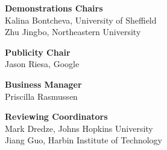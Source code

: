 {\bf Demonstrations Chairs} \\
Kalina Bontcheva, University of Sheffield \\
Zhu Jingbo, Northeastern University \\

{\bf Publicity Chair} \\
Jason Riesa, Google \\

{\bf Business Manager} \\
Priscilla Rasmussen \\

{\bf Reviewing Coordinators} \\
Mark Dredze, Johns Hopkins University \\
Jiang Guo, Harbin Institute of Technology \\

